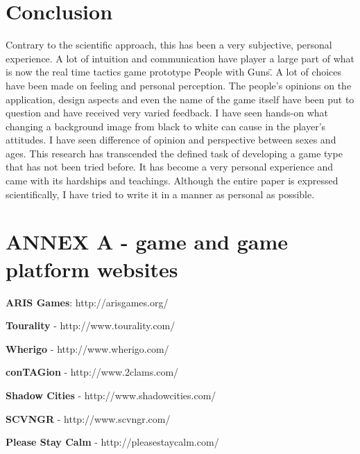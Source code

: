 \documentclass{article}
\begin{document}
\section{Conclusion}

Contrary to the scientific approach, this has been a very subjective, personal
experience. A lot of intuition and communication have player a large part of
what is now the real time tactics game prototype \"People with Guns\". A lot of
choices have been made on feeling and personal perception. The people's opinions
on the application, design aspects and even the name of the game itself have
been put to question and have received very varied feedback. I have seen
hands-on what changing a background image from black to white can cause in the
player's attitudes. I have seen difference of opinion and perspective between
sexes and ages. This research has transcended the defined task of developing a
game type that has not been tried before. It has become a very personal
experience and came with its hardships and teachings. Although the entire paper
is expressed scientifically, I have tried to write it in a manner as personal as
possible.\newline

\section{ANNEX A - game and game platform websites}



\nocite{teamtags}
\nocite{gps1}



\textbf{ARIS Games}: http://arisgames.org/ \newline

\textbf{Tourality} - http://www.tourality.com/ \newline

\textbf{Wherigo} - http://www.wherigo.com/ \newline

\textbf{conTAGion} - http://www.2clams.com/ \newline

\textbf{Shadow Cities} - http://www.shadowcities.com/ \newline

\textbf{SCVNGR} - http://www.scvngr.com/ \newline

\textbf{Please Stay Calm} - http://pleasestaycalm.com/ \newline
\end{document}
